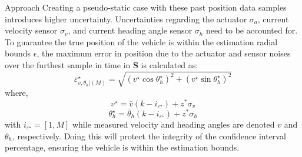 \begin{section}{Approach}
Creating a pseudo-static case with these past position data samples introduces higher uncertainty. Uncertainties regarding the actuator $\sigma_a$, current velocity sensor $\sigma_v$, and current heading angle sensor $\sigma_h$ need to be accounted for. To guarantee the true position of the vehicle is within the estimation radial bounds $\epsilon$, the maximum error in position due to the actuator and sensor noises over the furthest sample in time in $\mathcal{\bm{S}}$ is calculated as:
    \begin{equation}
	\varepsilon_{v,\theta_h|(M)}^{\star}=\sqrt{(v^{\star}\cos{\theta_h^{\star}})^2+(v^{\star}\sin{\theta_h^{\star}})^2}
	\end{equation}
where,
    \begin{equation}
	v^{\star}=\bar{v}(k-i_{\varepsilon^{\star}})+z^{*}\sigma_v \nonumber
	\end{equation}
	\begin{equation}
	\theta_h^{\star}=\bar{\theta}_h(k-i_{\varepsilon^{\star}})+z^{*}\sigma_h \nonumber
	\end{equation}
with $i_{\varepsilon^{\star}}=[1,M]$ while measured velocity and heading angles are denoted $v$ and $\theta_h$, respectively. Doing this will protect the integrity of the confidence interval percentage, ensuring the vehicle is within the estimation bounds.


\end{section}
